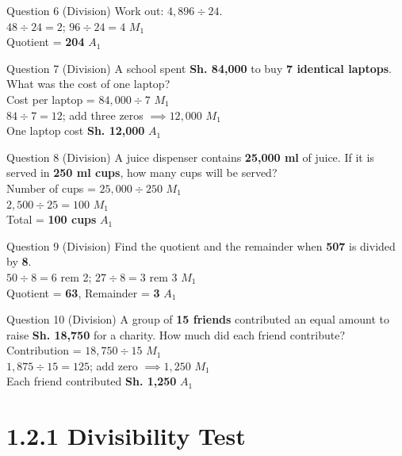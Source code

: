 \documentclass[12pt, a4paper, oneside]{article}
\begin{document}
\begin{solvingbox}{Question 6 (Division)}
Work out: \textbf{$4,896 \div 24$}. \\
$48 \div 24 = 2$; $96 \div 24 = 4$ \hfill $M_1$ \\
Quotient = \textbf{204} \hfill $A_1$
\end{solvingbox}

\begin{solvingbox}{Question 7 (Division)}
A school spent \textbf{Sh. 84,000} to buy \textbf{7 identical laptops}. What was the cost of one laptop? \\
Cost per laptop = $84,000 \div 7$ \hfill $M_1$ \\
$84 \div 7 = 12$; add three zeros $\implies 12,000$ \hfill $M_1$ \\
One laptop cost \textbf{Sh. 12,000} \hfill $A_1$
\end{solvingbox}

\begin{solvingbox}{Question 8 (Division)}
A juice dispenser contains \textbf{25,000 ml} of juice. If it is served in \textbf{250 ml cups}, how many cups will be served? \\
Number of cups = $25,000 \div 250$ \hfill $M_1$ \\
$2,500 \div 25 = 100$ \hfill $M_1$ \\
Total = \textbf{100 cups} \hfill $A_1$
\end{solvingbox}

\begin{solvingbox}{Question 9 (Division)}
Find the quotient and the remainder when \textbf{507} is divided by \textbf{8}. \\
$50 \div 8 = 6$ rem 2; $27 \div 8 = 3$ rem 3 \hfill $M_1$ \\
Quotient = \textbf{63}, Remainder = \textbf{3} \hfill $A_1$
\end{solvingbox}

\begin{solvingbox}{Question 10 (Division)}
A group of \textbf{15 friends} contributed an equal amount to raise \textbf{Sh. 18,750} for a charity. How much did each friend contribute? \\
Contribution = $18,750 \div 15$ \hfill $M_1$ \\
$1,875 \div 15 = 125$; add zero $\implies 1,250$ \hfill $M_1$ \\
Each friend contributed \textbf{Sh. 1,250} \hfill $A_1$
\end{solvingbox}

\section*{1.2.1 Divisibility Test}
\end{document}
